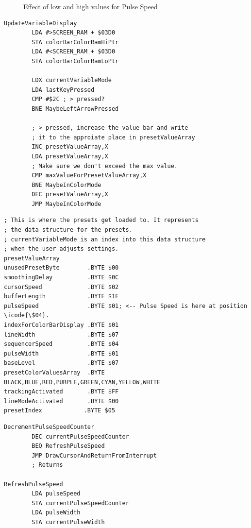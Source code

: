 \begin{figure}[H]
\begin{adjustbox}{width=10.5cm,margin=0cm -2cm}
    \end{adjustbox}
    \caption{Effect of low and high values for Pulse Speed}
\end{figure}


\begin{lstlisting}[caption=From \icode{CheckKeyboardInputForActiveVariable}. Pressing the < and > keys increments and
decrements the value in presetValueArray pointed to by \icode{X}\, i.e. \icode{currentVariableMode}.]
UpdateVariableDisplay   
        LDA #>SCREEN_RAM + $03D0
        STA colorBarColorRamHiPtr
        LDA #<SCREEN_RAM + $03D0
        STA colorBarColorRamLoPtr

        LDX currentVariableMode
        LDA lastKeyPressed
        CMP #$2C ; > pressed?
        BNE MaybeLeftArrowPressed

        ; > pressed, increase the value bar and write
        ; it to the approiate place in presetValueArray
        INC presetValueArray,X
        LDA presetValueArray,X
        ; Make sure we don't exceed the max value.
        CMP maxValueForPresetValueArray,X
        BNE MaybeInColorMode
        DEC presetValueArray,X
        JMP MaybeInColorMode
\end{lstlisting}

\begin{lstlisting}[caption=From \icode{ActivateSequencer}.]
; This is where the presets get loaded to. It represents
; the data structure for the presets.
; currentVariableMode is an index into this data structure
; when the user adjusts settings.
presetValueArray
unusedPresetByte        .BYTE $00
smoothingDelay          .BYTE $0C
cursorSpeed             .BYTE $02
bufferLength            .BYTE $1F
pulseSpeed              .BYTE $01; <-- Pulse Speed is here at position \icode{\$04}.
indexForColorBarDisplay .BYTE $01
lineWidth               .BYTE $07
sequencerSpeed          .BYTE $04 
pulseWidth              .BYTE $01
baseLevel               .BYTE $07
presetColorValuesArray  .BYTE BLACK,BLUE,RED,PURPLE,GREEN,CYAN,YELLOW,WHITE
trackingActivated       .BYTE $FF
lineModeActivated       .BYTE $00
presetIndex            .BYTE $05
\end{lstlisting}


\begin{lstlisting}[caption=From \icode{MainInterruptHandler}.]
DecrementPulseSpeedCounter   
        DEC currentPulseSpeedCounter
        BEQ RefreshPulseSpeed
        JMP DrawCursorAndReturnFromInterrupt
        ; Returns

RefreshPulseSpeed   
        LDA pulseSpeed
        STA currentPulseSpeedCounter
        LDA pulseWidth
        STA currentPulseWidth
\end{lstlisting}

